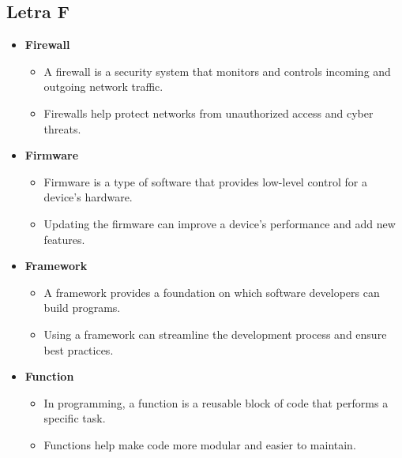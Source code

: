     \subsection{Letra F}
    \begin{itemize}
        \item \textbf{Firewall}
        \begin{itemize}
            \item A firewall is a security system that monitors and controls incoming and outgoing network traffic.
            \item Firewalls help protect networks from unauthorized access and cyber threats.
        \end{itemize}
        \item \textbf{Firmware}
        \begin{itemize}
            \item Firmware is a type of software that provides low-level control for a device's hardware.
            \item Updating the firmware can improve a device's performance and add new features.
        \end{itemize}
        \item \textbf{Framework}
        \begin{itemize}
            \item A framework provides a foundation on which software developers can build programs.
            \item Using a framework can streamline the development process and ensure best practices.
        \end{itemize}
        \item \textbf{Function}
        \begin{itemize}
            \item In programming, a function is a reusable block of code that performs a specific task.
            \item Functions help make code more modular and easier to maintain.
        \end{itemize}
    \end{itemize}

